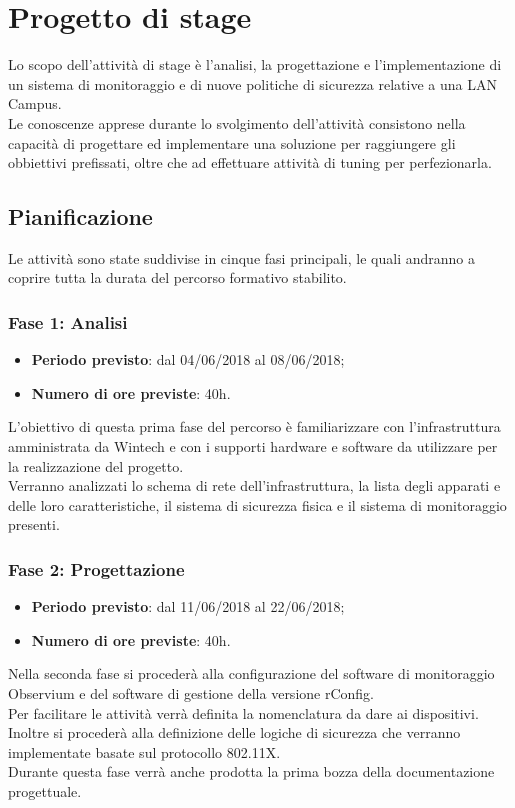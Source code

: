 \documentclass[Tesi.tex]{subfiles}
\begin{document}
\chapter{Progetto di stage}
Lo scopo dell'attività di stage è l’analisi, la progettazione e l'implementazione di un sistema di monitoraggio e di nuove politiche di sicurezza relative a una LAN Campus. \\
Le conoscenze apprese durante lo svolgimento dell'attività consistono nella capacità di progettare ed implementare una soluzione per raggiungere gli obbiettivi prefissati, oltre che ad effettuare attività di tuning per perfezionarla.


\section{Pianificazione}
Le attività sono state suddivise in cinque fasi principali, le quali andranno a coprire tutta la durata del percorso formativo stabilito.

\subsection{Fase 1: Analisi}
\begin{itemize}
	\item \textbf{Periodo previsto}: dal 04/06/2018 al 08/06/2018;
	\item \textbf{Numero di ore previste}: 40h.
\end{itemize}

L'obiettivo di questa prima fase del percorso è familiarizzare con l'infrastruttura amministrata da Wintech e con i supporti hardware e software da utilizzare per la realizzazione del progetto. \\
Verranno analizzati lo schema di rete dell'infrastruttura, la lista degli apparati e delle loro caratteristiche, il sistema di sicurezza fisica e il sistema di monitoraggio presenti. 

\newpage
\subsection{Fase 2: Progettazione}
\begin{itemize}
	\item \textbf{Periodo previsto}: dal 11/06/2018 al 22/06/2018;
	\item \textbf{Numero di ore previste}: 40h.
\end{itemize}
	
Nella seconda fase si procederà alla configurazione del software di monitoraggio Observium e del software di gestione della versione rConfig. \\
Per facilitare le attività verrà definita la nomenclatura da dare ai dispositivi.\\
Inoltre si procederà alla definizione delle logiche di sicurezza che verranno implementate basate sul protocollo 802.11X. \\
Durante questa fase verrà anche prodotta la prima bozza della documentazione progettuale.
	
\end{document}
